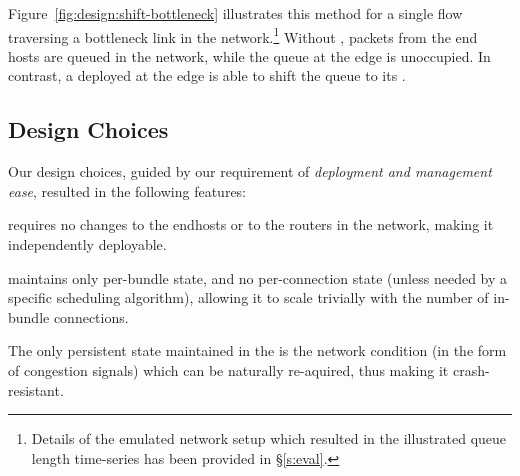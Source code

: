Figure~\ref{fig:design:shift-bottleneck} illustrates this method for a single flow traversing a bottleneck link in the network.\footnote{Details of the emulated network setup which resulted in the illustrated queue length time-series has been provided in \S\ref{s:eval}.} Without \name, packets from the end hosts are queued in the network, while the queue at the edge is unoccupied. In contrast, a \name deployed at the edge is able to shift the queue to its \inbox.









\subsection{Design Choices}

Our design choices, guided by our requirement of \emph{deployment and management ease}, resulted in the following features:

 \name requires no changes to the endhosts or to the routers in the network, making it independently deployable. 

 \name maintains only per-bundle state, and no per-connection state (unless needed by a specific scheduling algorithm), allowing it to scale trivially with the number of in-bundle connections. 

 The only persistent state maintained in the \name is the network condition (in the form of congestion signals) which can be naturally re-aquired, thus making it crash-resistant. 

